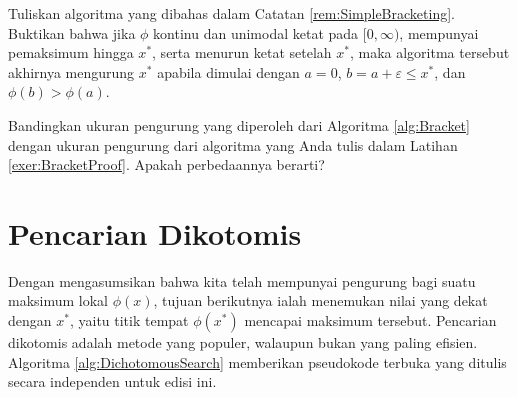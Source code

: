 \begin{exercise} Tuliskan algoritma yang dibahas dalam Catatan \ref{rem:SimpleBracketing}. Buktikan bahwa jika $\phi$ kontinu dan unimodal ketat pada $[0,\infty)$, mempunyai pemaksimum hingga $x^*$, serta menurun ketat setelah $x^*$, maka algoritma tersebut akhirnya mengurung $x^*$ apabila dimulai dengan $a=0$, $b=a+\varepsilon\leq x^*$, dan $\phi(b)>\phi(a)$.
\label{exer:BracketProof}
\end{exercise}

\begin{exercise} Bandingkan ukuran pengurung yang diperoleh dari Algoritma \ref{alg:Bracket} dengan ukuran pengurung dari algoritma yang Anda tulis dalam Latihan \ref{exer:BracketProof}. Apakah perbedaannya berarti?
\end{exercise}

\section{Pencarian Dikotomis}
\begin{remark} Dengan mengasumsikan bahwa kita telah mempunyai pengurung bagi suatu maksimum lokal $\phi(x)$, tujuan berikutnya ialah menemukan nilai yang dekat dengan $x^*$, yaitu titik tempat $\phi(x^*)$ mencapai maksimum tersebut. Pencarian dikotomis adalah metode yang populer, walaupun bukan yang paling efisien. Algoritma \ref{alg:DichotomousSearch} memberikan pseudokode terbuka yang ditulis secara independen untuk edisi ini.
\end{remark}

\begin{algorithm}
\caption{Pencarian Dikotomis}
\label{alg:DichotomousSearch}
\noindent{}
\end{algorithm}

